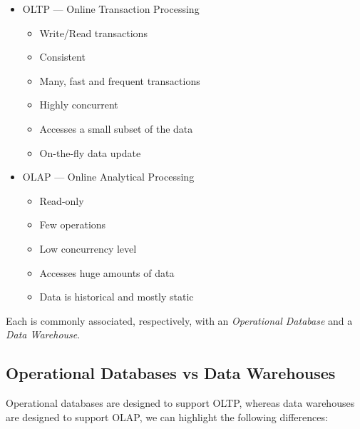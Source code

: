 \documentclass[openright, twoside, twocolumn, a4paper, 10pt]{report}
\begin{document}
\begin{itemize}
	\item OLTP --- Online Transaction Processing
	      \begin{itemize}
		      \item Write/Read transactions
		      \item Consistent
		      \item Many, fast and frequent transactions
		      \item Highly concurrent
		      \item Accesses a small subset of the data
		      \item On-the-fly data update
	      \end{itemize}
	\item OLAP --- Online Analytical Processing
	      \begin{itemize}
		      \item Read-only
		      \item Few operations
		      \item Low concurrency level
		      \item Accesses huge amounts of data
		      \item Data is historical and mostly static
	      \end{itemize}
\end{itemize}

Each is commonly associated, respectively, with an \emph{Operational Database}
and a \emph{Data Warehouse}.

\subsection{Operational Databases vs Data Warehouses}

Operational databases are designed to support OLTP, whereas data warehouses are designed to support OLAP,
we can highlight the following differences:
\end{document}
